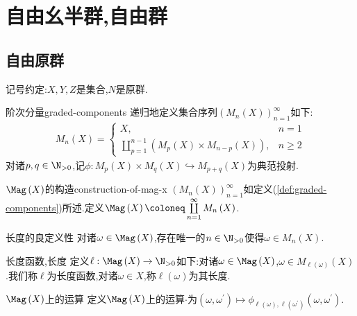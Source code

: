 \chapter{自由幺半群,自由群}

\section{自由原群}

记号约定:$X,Y,Z$是集合,$N$是原群.

\begin{definition}{阶次分量}{graded-components}
	递归地定义集合序列$\left(M_{n}\left(X\right)\right)_{n=1}^{\infty}$如下:
	\begin{align}
		M_{n}\left(X\right)=
		\begin{cases}
			X,&n=1\\
			\coprod\limits_{p=1}^{n-1}\left(M_{p}\left(X\right)\times M_{n-p}\left(X\right)\right),&n\geq 2
		\end{cases}
	\end{align}
	对诸$p,q\in\N_{>0}$,记$\phi:M_{p}\left(X\right)\times M_{q}\left(X\right)\hookrightarrow M_{p+q}\left(X\right)$为典范投射.
\end{definition}

\begin{definition}{$\Mag\left(X\right)$的构造}{construction-of-mag-x}
	$\left(M_{n}\left(X\right)\right)_{n=1}^{\infty}$如定义(\cref{def:graded-components})所述.定义$\Mag\left(X\right)\coloneq\coprod\limits_{n=1}^{\infty}M_{n}\left(X\right)$.
\end{definition}

\begin{proposition}{长度的良定义性}{}
	对诸$\omega\in\Mag\left(X\right)$,存在唯一的$n\in\N_{>0}$使得$\omega\in M_{n}\left(X\right)$.
\end{proposition}

\begin{definition}{长度函数,长度}{}
	定义$\ell:\Mag\left(X\right)\to\N_{>0}$如下:对诸$\omega\in\Mag\left(X\right)$,$\omega\in M_{\ell\left(\omega\right)}\left(X\right)$.我们称$\ell$为长度函数,对诸$\omega\in X$,称$\ell\left(\omega\right)$为其长度.
\end{definition}

\begin{definition}{$\Mag\left(X\right)$上的运算}{}
	定义$\Mag\left(X\right)$上的运算$\cdot$为$\left(\omega,\omega^{\prime}\right)\mapsto\phi_{\ell\left(\omega\right),\ell\left(\omega^{\prime}\right)}\left(\omega,\omega^{\prime}\right)$.
\end{definition}

